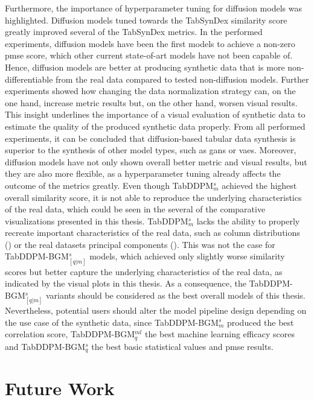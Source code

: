 Furthermore, the importance of hyperparameter tuning for diffusion models was highlighted.
Diffusion models tuned towards the TabSynDex similarity score greatly improved several of the TabSynDex metrics.
In the performed experiments, diffusion models have been the first models to achieve a non-zero \gls{pmse} score, which other current state-of-art models have not been capable of.
Hence, diffusion models are better at producing synthetic data that is more non-differentiable from the real data \cite{chundawat2022UniversalMetricRobust} compared to tested non-diffusion models.
Further experiments showed how changing the data normalization strategy can, on the one hand, increase metric results but, on the other hand, worsen visual results.
This insight underlines the importance of a visual evaluation of synthetic data to estimate the quality of the produced synthetic data properly.
From all performed experiments, it can be concluded that diffusion-based tabular data synthesis is superior to the synthesis of other \gls{model} types, such as \glspl{gan} or \glspl{vae}.
Moreover, diffusion models have not only shown overall better metric and visual results, but they are also more flexible, as a hyperparameter tuning already affects the outcome of the metrics greatly.
Even though TabDDPM$^{s}_{m}$ achieved the highest overall similarity score, it is not able to reproduce the underlying characteristics of the real data, which could be seen in the several of the comparative visualizations presented in this thesis.
TabDDPM$^{s}_{m}$ lacks the ability to properly recreate important characteristics of the real data, such as column distributions () or the real datasets principal components ().
This was not the case for TabDDPM-BGM$^{s}_{[q|m]}$ models, which achieved only slightly worse similarity scores but better capture the underlying characteristics of the real data, as indicated by the visual plots in this thesis.
As a consequence, the TabDDPM-BGM$^{s}_{[q|m]}$ variants should be considered as the best overall models of this thesis.
Nevertheless, potential users should alter the \gls{model} pipeline design depending on the use case of the synthetic data, since TabDDPM-BGM$^{s}_m$ produced the best correlation score, TabDDPM-BGM$^{ml}_q$ the best machine learning efficacy scores and TabDDPM-BGM$^{s}_q$ the best basic statistical values and \gls{pmse} results.
\newpage

\section{Future Work}
\label{ch:results-futureWork}

